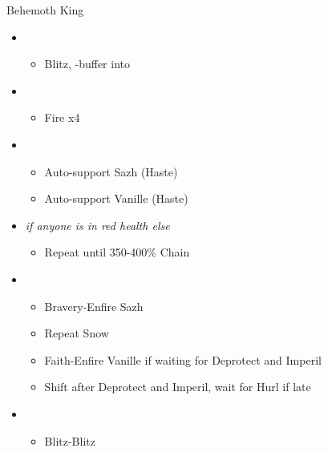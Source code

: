 \begin{battle}[0:55]{Behemoth King}
	\begin{itemize}
		\item \second
		      \begin{itemize}
			      \item Blitz, \rav-buffer into
		      \end{itemize}
		\item \sixth
		      \begin{itemize}
			      \item Fire x4
		      \end{itemize}
		\item \fourth
		      \begin{itemize}
			      \item Auto-support Sazh (Haste)
			      \item Auto-support Vanille (Haste)
		      \end{itemize}
		\item \fifth \textit{if anyone is in red health else} \sixth
		      \begin{itemize}
			      \item Repeat until 350-400\% Chain
		      \end{itemize}
		\item \third
		      \begin{itemize}
			      \item Bravery-Enfire Sazh
			      \item Repeat Snow
			      \item Faith-Enfire Vanille if waiting for Deprotect and Imperil
			      \item Shift after Deprotect and Imperil, wait for Hurl if late
		      \end{itemize}
		\item \second
		      \begin{itemize}
			      \item Blitz-Blitz
		      \end{itemize}
	\end{itemize}
\end{battle}
\vfill
